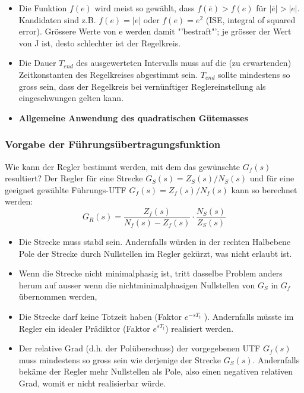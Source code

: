 \begin{itemize}
\item Die Funktion $f(e)$ wird meist so gewählt, dass $f(\overline{e}) > f(e)$ für $|\overline{e}| > |e|$.
Kandidaten sind z.B. $f(e) = |e|$ oder $f(e) = e^2$ (ISE, integral of squared
error). Grössere Werte von e werden damit "'bestraft"'; je grösser der Wert von
J ist, desto schlechter ist der Regelkreis.
\item Die Dauer $T_{end}$ des ausgewerteten Intervalls muss auf die (zu erwartenden)
Zeitkonstanten des Regelkreises abgestimmt sein. $T_{end}$ sollte mindestens so
gross sein, dass der Regelkreis bei vernünftiger Reglereinstellung als eingeschwungen gelten kann.
\item \textbf{Allgemeine Anwendung des quadratischen Gütemasses }
\end{itemize}


\subsubsection{Vorgabe der Führungsübertragungsfunktion }

Wie kann der Regler bestimmt werden, mit dem das gewünschte $G_f(s)$ resultiert?
Der Regler für eine Strecke $G_S(s) = Z_S(s)/N_S(s)$ und für eine geeignet gewählte
Führungs-UTF $G_f(s) = Z_f(s)/N_f(s)$ kann so berechnet werden:
\begin{equation}
\boxed{G_R(s)=\frac{Z_f(s)}{N_f(s)-Z_f(s)}\cdot\frac{N_S(s)}{Z_S(s)}}
\end{equation}
\begin{itemize}
\item  Die Strecke muss stabil sein. Andernfalls würden in der rechten Halbebene
Pole der Strecke durch Nullstellen im Regler gekürzt, was nicht erlaubt ist.
\item  Wenn die Strecke nicht minimalphasig ist, tritt dasselbe Problem anders herum
auf ausser wenn die nichtminimalphasigen Nullstellen von $G_S$ in $G_f$
übernommen werden, 
\item  Die Strecke darf keine Totzeit haben (Faktor $e^{-sT_t}$ ). Andernfalls müsste im
Regler ein idealer Prädiktor (Faktor $e^{sT_t}$) realisiert werden.
\item  Der relative Grad (d.h. der Polüberschuss) der vorgegebenen UTF $G_f (s)$ muss
mindestens so gross sein wie derjenige der Strecke $G_S(s)$. Andernfalls bekäme
der Regler mehr Nullstellen als Pole, also einen negativen relativen Grad, womit
er nicht realisierbar würde.
\end{itemize}
